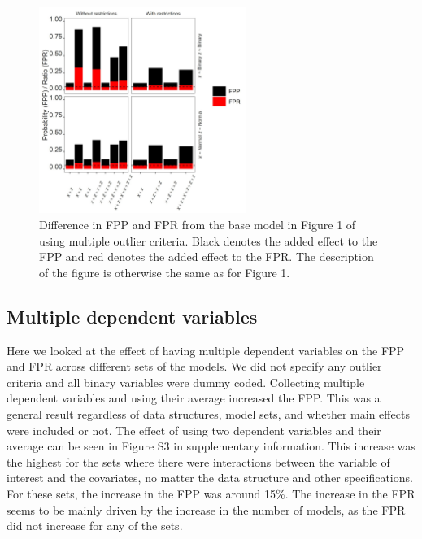\begin{figure}[hbt!]
\includegraphics[width=0.6\textwidth]{R/Analysis/Result/Figures/Figure1B.jpeg}
\centering
\caption{Difference in FPP and FPR from the base model in Figure 1 of using multiple outlier criteria. Black denotes the added effect to the FPP and red denotes the added effect to the FPR.  The description of the figure is otherwise the same as for Figure 1.}
\label{fig:mainfigure}
\end{figure}

\subsection{Multiple dependent variables}
Here we looked at the effect of having multiple dependent variables on the FPP and FPR across different sets of the models. We did not specify any outlier criteria and all binary variables were dummy coded. Collecting multiple dependent variables and using their average increased the FPP. This was a general result regardless of data structures, model sets, and whether main effects were included or not. The effect of using two dependent variables and their average can be seen in Figure S3 in supplementary information. This increase was the highest for the sets where there were interactions between the variable of interest and the covariates, no matter the data structure and other specifications. For these sets, the increase in the FPP was around 15\%. The increase in the FPR seems to be mainly driven by the increase in the number of models, as the FPR did not increase for any of the sets. 

